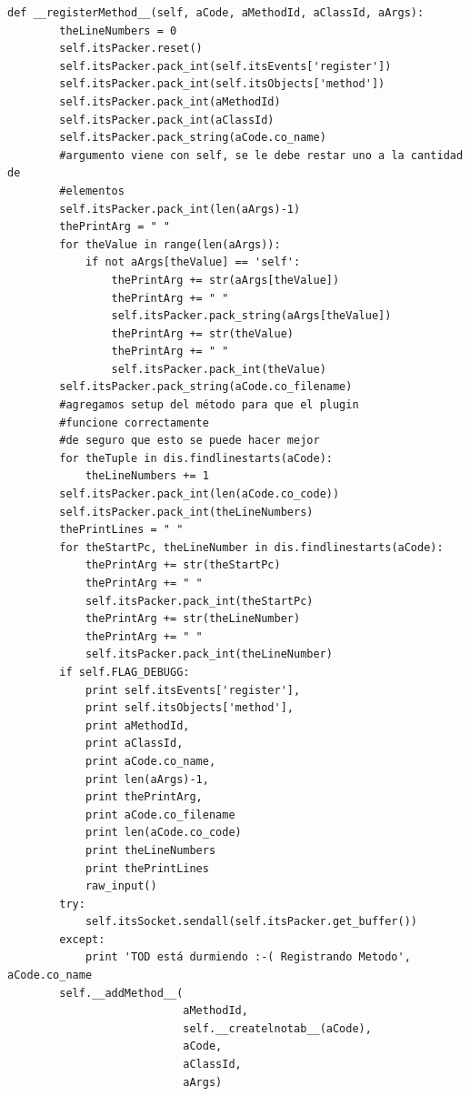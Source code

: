 \documentclass[12pt,legalpaper]{report}
\begin{document}
\begin{singlespace}
\begin{lstlisting}[style=Python]
    def __registerMethod__(self, aCode, aMethodId, aClassId, aArgs):
        theLineNumbers = 0
        self.itsPacker.reset()
        self.itsPacker.pack_int(self.itsEvents['register'])
        self.itsPacker.pack_int(self.itsObjects['method'])
        self.itsPacker.pack_int(aMethodId)
        self.itsPacker.pack_int(aClassId)
        self.itsPacker.pack_string(aCode.co_name)
        #argumento viene con self, se le debe restar uno a la cantidad de
        #elementos
        self.itsPacker.pack_int(len(aArgs)-1)
        thePrintArg = " "
        for theValue in range(len(aArgs)):
            if not aArgs[theValue] == 'self':
                thePrintArg += str(aArgs[theValue])
                thePrintArg += " "
                self.itsPacker.pack_string(aArgs[theValue])
                thePrintArg += str(theValue)
                thePrintArg += " "
                self.itsPacker.pack_int(theValue)
        self.itsPacker.pack_string(aCode.co_filename)
        #agregamos setup del método para que el plugin
        #funcione correctamente
        #de seguro que esto se puede hacer mejor
        for theTuple in dis.findlinestarts(aCode):
            theLineNumbers += 1
        self.itsPacker.pack_int(len(aCode.co_code))        
        self.itsPacker.pack_int(theLineNumbers)
        thePrintLines = " "
        for theStartPc, theLineNumber in dis.findlinestarts(aCode):
            thePrintArg += str(theStartPc)
            thePrintArg += " "            
            self.itsPacker.pack_int(theStartPc)
            thePrintArg += str(theLineNumber)
            thePrintArg += " "            
            self.itsPacker.pack_int(theLineNumber)
        if self.FLAG_DEBUGG:
            print self.itsEvents['register'],
            print self.itsObjects['method'],
            print aMethodId,
            print aClassId,
            print aCode.co_name,
            print len(aArgs)-1,
            print thePrintArg,
            print aCode.co_filename
            print len(aCode.co_code)
            print theLineNumbers
            print thePrintLines
            raw_input()
        try:
            self.itsSocket.sendall(self.itsPacker.get_buffer())
        except:
            print 'TOD está durmiendo :-( Registrando Metodo', aCode.co_name
        self.__addMethod__(
                           aMethodId,
                           self.__createlnotab__(aCode),
                           aCode,
                           aClassId,
                           aArgs)
        

\end{lstlisting}
\end{singlespace}
\end{document}
